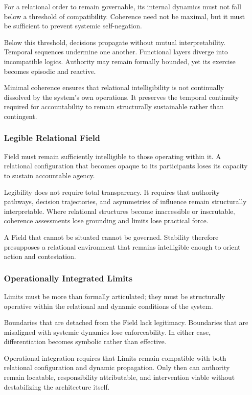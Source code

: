 \documentclass[12pt]{article}
\begin{document}
For a relational order to remain governable, its internal dynamics must not fall below a threshold of compatibility. Coherence need not be maximal, but it must be sufficient to prevent systemic self-negation.

Below this threshold, decisions propagate without mutual interpretability. Temporal sequences undermine one another. Functional layers diverge into incompatible logics. Authority may remain formally bounded, yet its exercise becomes episodic and reactive.

Minimal coherence ensures that relational intelligibility is not continually dissolved by the system’s own operations. It preserves the temporal continuity required for accountability to remain structurally sustainable rather than contingent.

\subsubsection{Legible Relational Field}


Field must remain sufficiently intelligible to those operating within it. A relational configuration that becomes opaque to its participants loses its capacity to sustain accountable agency.

Legibility does not require total transparency. It requires that authority pathways, decision trajectories, and asymmetries of influence remain structurally interpretable. Where relational structures become inaccessible or inscrutable, coherence assessments lose grounding and limits lose practical force.

A Field that cannot be situated cannot be governed. Stability therefore presupposes a relational environment that remains intelligible enough to orient action and contestation.

\subsubsection{Operationally Integrated Limits}


Limits must be more than formally articulated; they must be structurally operative within the relational and dynamic conditions of the system.

Boundaries that are detached from the Field lack legitimacy. Boundaries that are misaligned with systemic dynamics lose enforceability. In either case, differentiation becomes symbolic rather than effective.

Operational integration requires that Limits remain compatible with both relational configuration and dynamic propagation. Only then can authority remain locatable, responsibility attributable, and intervention viable without destabilizing the architecture itself.
\end{document}
